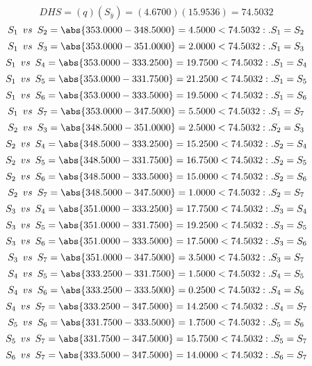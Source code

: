 $$DHS=(q)(S_{\bar{y}})=(4.6700)(15.9536)=74.5032$$
$$S_{1} \enspace vs \enspace S_{2} = \abs{353.0000-348.5000}=4.5000<74.5032:.S_{1}=S_{2}$$
$$S_{1} \enspace vs \enspace S_{3} = \abs{353.0000-351.0000}=2.0000<74.5032:.S_{1}=S_{3}$$
$$S_{1} \enspace vs \enspace S_{4} = \abs{353.0000-333.2500}=19.7500<74.5032:.S_{1}=S_{4}$$
$$S_{1} \enspace vs \enspace S_{5} = \abs{353.0000-331.7500}=21.2500<74.5032:.S_{1}=S_{5}$$
$$S_{1} \enspace vs \enspace S_{6} = \abs{353.0000-333.5000}=19.5000<74.5032:.S_{1}=S_{6}$$
$$S_{1} \enspace vs \enspace S_{7} = \abs{353.0000-347.5000}=5.5000<74.5032:.S_{1}=S_{7}$$
$$S_{2} \enspace vs \enspace S_{3} = \abs{348.5000-351.0000}=2.5000<74.5032:.S_{2}=S_{3}$$
$$S_{2} \enspace vs \enspace S_{4} = \abs{348.5000-333.2500}=15.2500<74.5032:.S_{2}=S_{4}$$
$$S_{2} \enspace vs \enspace S_{5} = \abs{348.5000-331.7500}=16.7500<74.5032:.S_{2}=S_{5}$$
$$S_{2} \enspace vs \enspace S_{6} = \abs{348.5000-333.5000}=15.0000<74.5032:.S_{2}=S_{6}$$
$$S_{2} \enspace vs \enspace S_{7} = \abs{348.5000-347.5000}=1.0000<74.5032:.S_{2}=S_{7}$$
$$S_{3} \enspace vs \enspace S_{4} = \abs{351.0000-333.2500}=17.7500<74.5032:.S_{3}=S_{4}$$
$$S_{3} \enspace vs \enspace S_{5} = \abs{351.0000-331.7500}=19.2500<74.5032:.S_{3}=S_{5}$$
$$S_{3} \enspace vs \enspace S_{6} = \abs{351.0000-333.5000}=17.5000<74.5032:.S_{3}=S_{6}$$
$$S_{3} \enspace vs \enspace S_{7} = \abs{351.0000-347.5000}=3.5000<74.5032:.S_{3}=S_{7}$$
$$S_{4} \enspace vs \enspace S_{5} = \abs{333.2500-331.7500}=1.5000<74.5032:.S_{4}=S_{5}$$
$$S_{4} \enspace vs \enspace S_{6} = \abs{333.2500-333.5000}=0.2500<74.5032:.S_{4}=S_{6}$$
$$S_{4} \enspace vs \enspace S_{7} = \abs{333.2500-347.5000}=14.2500<74.5032:.S_{4}=S_{7}$$
$$S_{5} \enspace vs \enspace S_{6} = \abs{331.7500-333.5000}=1.7500<74.5032:.S_{5}=S_{6}$$
$$S_{5} \enspace vs \enspace S_{7} = \abs{331.7500-347.5000}=15.7500<74.5032:.S_{5}=S_{7}$$
$$S_{6} \enspace vs \enspace S_{7} = \abs{333.5000-347.5000}=14.0000<74.5032:.S_{6}=S_{7}$$

% 
% 
% 
% 
% 
% 
% 

